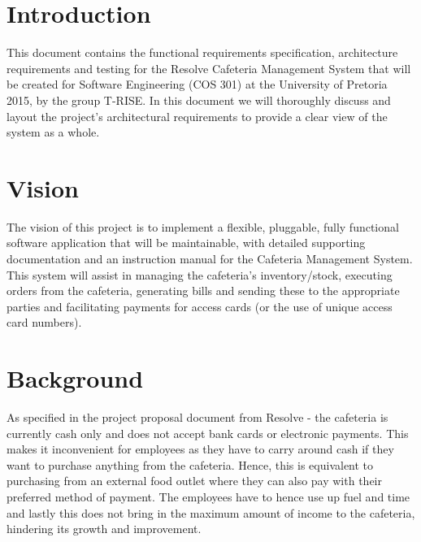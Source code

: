 \documentclass[12pt]{article}
\begin{document}
\maketitle
\break

\tableofcontents
\break


\section{Introduction}
This document contains the functional requirements specification, architecture requirements and testing for the Resolve Cafeteria Management System that will be created for Software Engineering (COS 301) at the University of Pretoria 2015, by the group T-RISE. In this document we will thoroughly discuss and layout the project's architectural requirements to provide a clear view of the system as a whole.  

\section{Vision}
The vision of this project is to implement a flexible, pluggable, fully functional software application that will be maintainable, with detailed supporting documentation and an instruction manual for the Cafeteria Management System. This system will assist in managing the cafeteria's inventory/stock, executing orders from the cafeteria, generating bills and sending these to the appropriate parties and facilitating payments for access cards (or the use of unique access card numbers). 

\section{Background}
As specified in the project proposal document from Resolve - the cafeteria is currently cash only and does not accept bank cards or electronic payments. This makes it inconvenient for employees as they have to carry around cash if they want to purchase anything from the cafeteria. Hence, this is equivalent to purchasing from an external food outlet where they can also pay with their preferred method of payment. The employees have to hence use up fuel and time and lastly this does not bring in the maximum amount of income to the cafeteria, hindering its growth and improvement.\\
\end{document}
